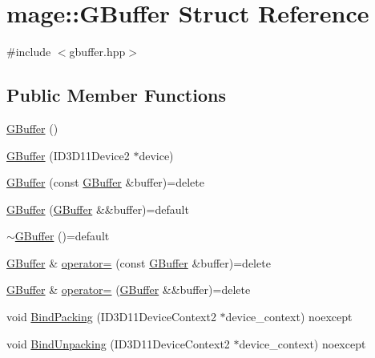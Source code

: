 \hypertarget{structmage_1_1_g_buffer}{}\section{mage\+:\+:G\+Buffer Struct Reference}
\label{structmage_1_1_g_buffer}


{\ttfamily \#include $<$gbuffer.\+hpp$>$}

\subsection*{Public Member Functions}
\begin{DoxyCompactItemize}
\item 
\hyperlink{structmage_1_1_g_buffer_a9111bf3ce5bf0a0648b3958b516386ae}{G\+Buffer} ()
\item 
\hyperlink{structmage_1_1_g_buffer_a7cb5a37658f5bc124a8c71d6a227d858}{G\+Buffer} (I\+D3\+D11\+Device2 $\ast$device)
\item 
\hyperlink{structmage_1_1_g_buffer_a3d437fcd8cb2b2ceb2f7c8f06a6d2690}{G\+Buffer} (const \hyperlink{structmage_1_1_g_buffer}{G\+Buffer} \&buffer)=delete
\item 
\hyperlink{structmage_1_1_g_buffer_aa020a8c3b269d88d814c3664d03d03c6}{G\+Buffer} (\hyperlink{structmage_1_1_g_buffer}{G\+Buffer} \&\&buffer)=default
\item 
\hyperlink{structmage_1_1_g_buffer_ace75566b38462d7edd1299379e418318}{$\sim$\+G\+Buffer} ()=default
\item 
\hyperlink{structmage_1_1_g_buffer}{G\+Buffer} \& \hyperlink{structmage_1_1_g_buffer_ac4b12cce6a06866958f3a674d7a7dcae}{operator=} (const \hyperlink{structmage_1_1_g_buffer}{G\+Buffer} \&buffer)=delete
\item 
\hyperlink{structmage_1_1_g_buffer}{G\+Buffer} \& \hyperlink{structmage_1_1_g_buffer_ab1d4ae70de89c0549f54ee76b0b078c3}{operator=} (\hyperlink{structmage_1_1_g_buffer}{G\+Buffer} \&\&buffer)=delete
\item 
void \hyperlink{structmage_1_1_g_buffer_a90645118643a60f597741ebb319eb077}{Bind\+Packing} (I\+D3\+D11\+Device\+Context2 $\ast$device\+\_\+context) noexcept
\item 
void \hyperlink{structmage_1_1_g_buffer_ae8495251fe7fc2402f8f8bae30c57b94}{Bind\+Unpacking} (I\+D3\+D11\+Device\+Context2 $\ast$device\+\_\+context) noexcept
\end{DoxyCompactItemize}
